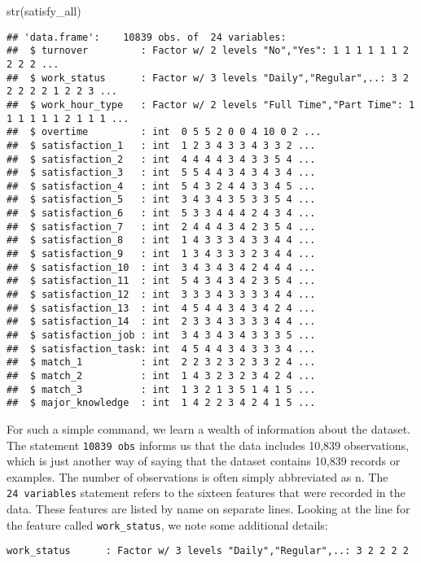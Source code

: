 \documentclass[
]{book}
\newenvironment{Shaded}{\begin{snugshade}}{\end{snugshade}}
\newcommand{\FunctionTok}[1]{\textcolor[rgb]{0.00,0.00,0.00}{#1}}
\newcommand{\NormalTok}[1]{#1}
\begin{document}
\begin{Shaded}
\begin{Highlighting}[]
\FunctionTok{str}\NormalTok{(satisfy\_all)}
\end{Highlighting}
\end{Shaded}

\begin{verbatim}
## 'data.frame':    10839 obs. of  24 variables:
##  $ turnover         : Factor w/ 2 levels "No","Yes": 1 1 1 1 1 1 2 2 2 2 ...
##  $ work_status      : Factor w/ 3 levels "Daily","Regular",..: 3 2 2 2 2 2 1 2 2 3 ...
##  $ work_hour_type   : Factor w/ 2 levels "Full Time","Part Time": 1 1 1 1 1 1 2 1 1 1 ...
##  $ overtime         : int  0 5 5 2 0 0 4 10 0 2 ...
##  $ satisfaction_1   : int  1 2 3 4 3 3 4 3 3 2 ...
##  $ satisfaction_2   : int  4 4 4 4 3 4 3 3 5 4 ...
##  $ satisfaction_3   : int  5 5 4 4 3 4 3 4 3 4 ...
##  $ satisfaction_4   : int  5 4 3 2 4 4 3 3 4 5 ...
##  $ satisfaction_5   : int  3 4 3 4 3 5 3 3 5 4 ...
##  $ satisfaction_6   : int  5 3 3 4 4 4 2 4 3 4 ...
##  $ satisfaction_7   : int  2 4 4 4 3 4 2 3 5 4 ...
##  $ satisfaction_8   : int  1 4 3 3 3 4 3 3 4 4 ...
##  $ satisfaction_9   : int  1 3 4 3 3 3 2 3 4 4 ...
##  $ satisfaction_10  : int  3 4 3 4 3 4 2 4 4 4 ...
##  $ satisfaction_11  : int  5 4 3 4 3 4 2 3 5 4 ...
##  $ satisfaction_12  : int  3 3 3 4 3 3 3 3 4 4 ...
##  $ satisfaction_13  : int  4 5 4 4 3 4 3 4 2 4 ...
##  $ satisfaction_14  : int  2 3 3 4 3 3 3 3 4 4 ...
##  $ satisfaction_job : int  3 4 3 4 3 4 3 3 3 5 ...
##  $ satisfaction_task: int  4 5 4 4 3 4 3 3 3 4 ...
##  $ match_1          : int  2 2 3 2 3 2 3 3 2 4 ...
##  $ match_2          : int  1 4 3 2 3 2 3 4 2 4 ...
##  $ match_3          : int  1 3 2 1 3 5 1 4 1 5 ...
##  $ major_knowledge  : int  1 4 2 2 3 4 2 4 1 5 ...
\end{verbatim}

For such a simple command, we learn a wealth of information about the dataset.
The statement \texttt{10839\ obs} informs us that the data includes 10,839 observations, which is just another way of saying that the dataset contains 10,839 records or examples. The number of observations is often simply abbreviated as n.
The \texttt{24\ variables} statement refers to the sixteen features that were recorded in the data. These features are listed by name on separate lines. Looking at the line for the feature called \texttt{work\_status}, we note some additional details:

\texttt{work\_status\ \ \ \ \ \ :\ Factor\ w/\ 3\ levels\ "Daily","Regular",..:\ 3\ 2\ 2\ 2\ 2}
\end{document}
